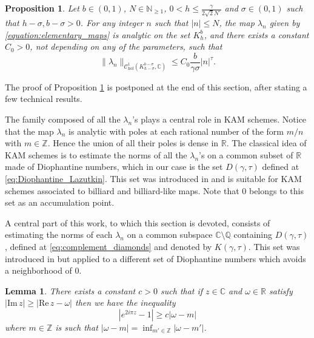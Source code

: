 \documentclass[10pt]{article}
\newtheorem{lemma}[theorem]{Lemma}
\newtheorem{proposition}[theorem]{Proposition}
\newcommand{\N}{\mathbb{N}}
\newcommand{\R}{\mathbb{R}}
\newcommand{\re}{\text{Re}\,}
\newcommand{\im}{\text{Im}\,}
\newcommand{\ZZ}{\mathbb{Z}}
\newcommand{\QQ}{\mathbb{Q}}
\newcommand{\RR}{\mathbb{R}}
\newcommand{\CC}{\mathbb{C}}
\begin{document}
\begin{proposition}
\label{proposition:bound_elementary}
Let $b\in(0,1)$, $N \in \N_{\geq 1}$, $0 < h \leq \tfrac{\gamma}{2\sqrt 2N^{\tau}}$ and $\sigma\in(0,1)$ such that $h-\sigma,b-\sigma>0$. For any integer $n$ such that $|n|\leq N$, the map $\lambda_n$ given by \eqref{equation:elementary_maps} is analytic on the set $K_h^b$, and there exists a constant $C_0 > 0$, not depending on any of the parameters, such that 
\[
\|\lambda_n\|_{\mathscr C^1_{\text{hol}}(K_{h-\sigma}^{b-\sigma},\CC)}
\leq
C_0\frac{b}{\gamma\sigma}|n|^{\tau}.
\]
\end{proposition}
The proof of Proposition \ref{proposition:bound_elementary} is postponed at the end of this section, after stating a few technical results.
\vspace{0.2cm}

The family composed of all the $\lambda_n$'s plays a central role in KAM schemes. Notice that the map $\lambda_n$ is analytic with poles at each rational number of the form $m/n$ with $m\in\ZZ$. Hence the union of all their poles is dense in $\R$. The classical idea of KAM schemes is to estimate the norms of all the $\lambda_n$'s on a common subset of $\R$ made of Diophantine numbers, which in our case is the set $D(\gamma,\tau)$ defined at \eqref{eq:Diophantine_Lazutkin}. This set was introduced in \cite{Lazutkin_KAM} and is suitable for KAM schemes associated to billiard and billiard-like maps. Note that $0$ belongs to this set as an accumulation point.

A central part of this work, to which this section is devoted, consists of estimating the norms of each $\lambda_n$ on a common subspace $\CC\setminus\QQ$ containing $D(\gamma, \tau)$, defined at \eqref{eq:complement_diamonds} and denoted by $K(\gamma,\tau)$. This set was introduced in \cite{CMS} but applied to a different set of Diophantine numbers which avoids a neighborhood of $0$.
\vspace{0.2cm}

\begin{lemma}
\label{lemma:bound_complexification}
There exists a constant $c>0$ such that if $z\in\CC$ and $\omega\in\RR$ satisfy
$|\im z|\geq |\re z-\omega|$
then we have the inequality
$$|e^{2i\pi z}-1|\geq c|\omega-m|$$
where $m\in\ZZ$ is such that $|\omega-m|=\inf_{m'\in\ZZ}|\omega-m'|$.
\end{lemma}
\end{document}
